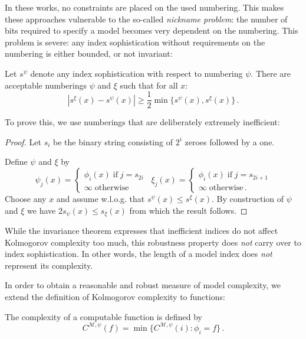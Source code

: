 \documentclass{style/llncs}
\newcommand{\M}{\mathscr M}
\newcommand{\p}{\,\text{.}}
\begin{document}
In these works, no constraints are placed on the used numbering. This makes these approaches vulnerable to the so-called \emph{nickname problem}: the number of bits required to specify a model becomes very dependent on the numbering. This problem is severe: any index sophistication without requirements on the numbering is either bounded, or not invariant:

\begin{lemma}
Let $s^\psi$ denote any index sophistication with respect to numbering $\psi$.
There are acceptable numberings $\psi$ and $\xi$ such that for all $x$:
\[|s^\xi(x) - s^\psi(x)|\geq \frac{1}{2}\min\{s^\psi(x),s^\xi(x)\}\p\]
\end{lemma}

To prove this, we use numberings that are deliberately extremely inefficient:

\begin{proof}
Let $s_i$ be the binary string consisting of $2^{i}$ zeroes followed by a one.

Define $\psi$ and $\xi$ by
\[
\psi_j(x) = \begin{cases}
	\phi_i(x) \;\text{if}\; j = s_{2i}\\
	\infty\;\text{otherwise}
\end{cases}\,\,\,
\xi_j(x) = 
\begin{cases}
	\phi_i(x) \;\text{if}\; j = s_{2i+1} \\
	\infty \;\text{otherwise}\p
\end{cases}
\]
Choose any $x$ and assume w.l.o.g. that $s^\psi(x)\le s^\xi(x)$. By construction of $\psi$ and $\xi$ we have $2s_\psi(x)  \leq s_\xi(x)$ from which the result follows.
\end{proof}
While the invariance theorem expresses that inefficient indices do not affect Kolmogorov complexity too much, this robustness property does \emph{not} carry over to index sophistication. In other words, the length of a model index does \emph{not} represent its complexity.

In order to obtain a reasonable and robust measure of model complexity, we  extend the definition of Kolmogorov complexity to functions:

\begin{definition}
The complexity of a computable function is defined by \label{definition:model-complexity}
\[
C^{\M,\psi}(f) = \min\{C^{\M,\psi}(i):\phi_i=f\}\p
\]
\end{definition}
\end{document}
